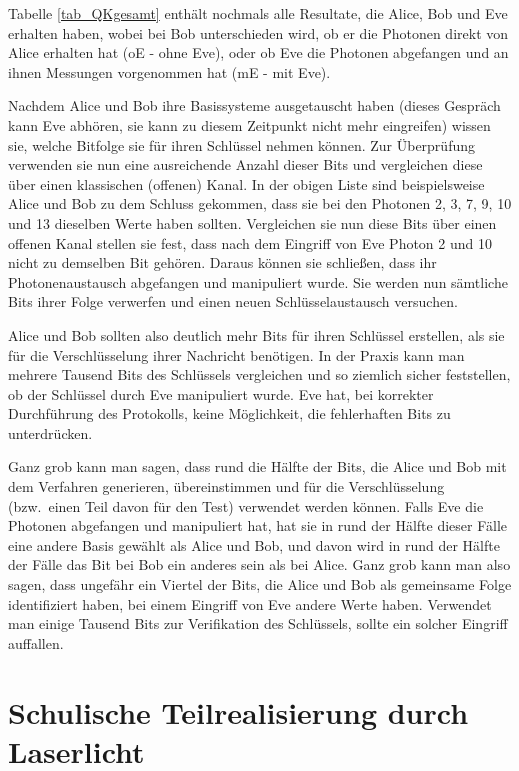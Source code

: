 Tabelle \ref{tab_QKgesamt} enth\"alt nochmals alle Resultate, die Alice, Bob und Eve erhalten haben, wobei bei
Bob unterschieden wird, ob er die Photonen direkt von Alice erhalten hat (oE - ohne Eve), oder ob
Eve die Photonen abgefangen und an ihnen Messungen vorgenommen hat (mE - mit Eve).

Nachdem Alice und Bob ihre Basissysteme ausgetauscht haben (dieses Gespr\"ach kann Eve abh\"oren,
sie kann zu diesem Zeitpunkt nicht mehr eingreifen) wissen sie, welche Bitfolge sie f\"ur ihren Schl\"ussel
nehmen k\"onnen. Zur \"Uberpr\"ufung verwenden sie nun eine ausreichende Anzahl dieser Bits und
vergleichen diese \"uber einen klassischen (offenen) Kanal. In der obigen Liste sind beispielsweise
Alice und Bob zu dem Schluss gekommen, dass sie bei den Photonen 2, 3, 7, 9, 10 und 13 dieselben
Werte haben sollten. Vergleichen sie nun diese Bits \"uber einen offenen Kanal stellen
sie fest, dass nach dem Eingriff von Eve Photon 2 und 10 nicht zu demselben Bit geh\"oren. Daraus
k\"onnen sie schlie\ss en, dass ihr Photonenaustausch abgefangen und manipuliert wurde. Sie werden
nun s\"amtliche Bits ihrer Folge verwerfen und einen neuen Schl\"usselaustausch versuchen. 

Alice und Bob sollten also deutlich mehr
Bits f\"ur ihren Schl\"ussel erstellen, als sie f\"ur die Verschl\"usselung ihrer Nachricht ben\"otigen. In der
Praxis kann man mehrere Tausend Bits des Schl\"ussels vergleichen und so ziemlich sicher feststellen,
ob der Schl\"ussel durch Eve manipuliert wurde. Eve hat, bei korrekter Durchf\"uhrung des Protokolls,
keine M\"oglichkeit, die fehlerhaften Bits zu unterdr\"ucken. 

Ganz grob kann man sagen, dass rund die H\"alfte der Bits, die Alice und Bob mit dem Verfahren
generieren, \"ubereinstimmen und f\"ur die Verschl\"usselung (bzw.\ einen Teil davon f\"ur den Test)
verwendet werden k\"onnen. Falls Eve die Photonen abgefangen und manipuliert hat, hat sie in rund
der H\"alfte dieser F\"alle eine andere Basis gew\"ahlt als Alice und Bob, und davon wird in rund
der H\"alfte der F\"alle das Bit bei Bob ein anderes sein als bei Alice. Ganz grob kann man also
sagen, dass ungef\"ahr
ein Viertel der Bits, die Alice und Bob als gemeinsame Folge identifiziert haben, bei einem
Eingriff von Eve andere Werte haben. Verwendet man einige Tausend Bits zur Verifikation des
Schl\"ussels, sollte ein solcher Eingriff auffallen. 

\section{Schulische Teilrealisierung durch Laserlicht}

